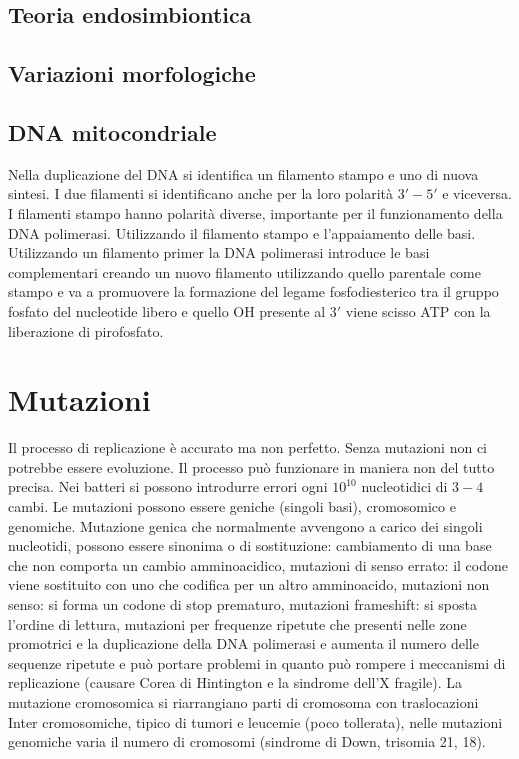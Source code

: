 	\subsection{Teoria endosimbiontica}

	\subsection{Variazioni morfologiche}

	\subsection{DNA mitocondriale}












Nella duplicazione del DNA si identifica un filamento stampo e uno di nuova sintesi. I due filamenti si identificano anche per la loro polarit\`a $3'-5'$ e viceversa. I filamenti stampo
hanno polarit\`a diverse, importante per il funzionamento della DNA polimerasi. Utilizzando il filamento stampo e l'appaiamento delle basi. Utilizzando un filamento primer la DNA
polimerasi introduce le basi complementari creando un nuovo filamento utilizzando quello parentale come stampo e va a promuovere la formazione del legame fosfodiesterico tra il gruppo
fosfato del nucleotide libero e quello OH presente al $3'$ viene scisso ATP con la liberazione di pirofosfato. 
\section{Mutazioni}
Il processo di replicazione \`e accurato ma non perfetto. Senza mutazioni non ci potrebbe essere evoluzione. Il processo pu\`o funzionare in maniera non del tutto precisa. Nei batteri
si possono introdurre errori ogni $10^{10}$ nucleotidici di $3-4$ cambi. Le mutazioni possono essere geniche (singoli basi), cromosomico e genomiche. Mutazione genica che normalmente 
avvengono a carico dei singoli nucleotidi, possono essere sinonima o di sostituzione: cambiamento di una base che non comporta un cambio amminoacidico, mutazioni di senso errato: il
codone viene sostituito con uno che codifica per un altro amminoacido, mutazioni non senso: si forma un codone di stop prematuro, mutazioni frameshift: si sposta l'ordine di lettura, 
mutazioni per frequenze ripetute che presenti nelle zone promotrici e la duplicazione della DNA polimerasi e aumenta il numero delle sequenze ripetute e pu\`o portare problemi in quanto
pu\`o rompere i meccanismi di replicazione (causare Corea di Hintington e la sindrome dell'X fragile). La mutazione cromosomica si riarrangiano parti di cromosoma con traslocazioni 
Inter cromosomiche, tipico di tumori e leucemie (poco tollerata), nelle mutazioni genomiche varia il numero di cromosomi (sindrome di Down, trisomia 21, 18). 
